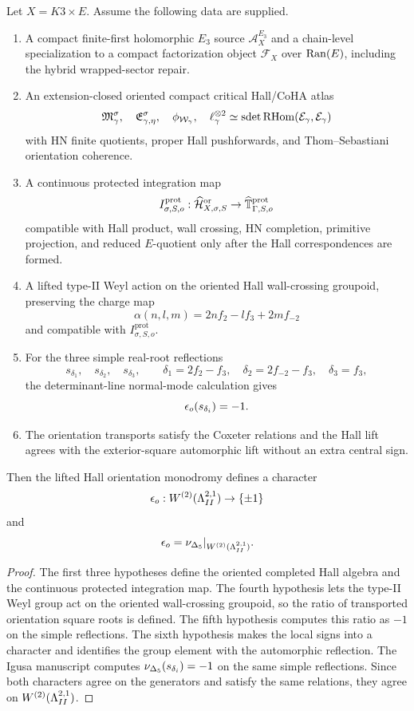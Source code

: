 \begin{theorem}
\label{thm:agent15d-conditional-protected-integration}
Let \(X=K3\times E\).  Assume the following data are supplied.
\begin{enumerate}
\item A compact finite-first holomorphic \(E_3\) source
\(\mathcal A^{E_3}_X\) and a chain-level specialization to a compact
factorization object \(\mathcal F_X\) over \(\operatorname{Ran}(E)\), including the
hybrid wrapped-sector repair.
\item An extension-closed oriented compact critical Hall/CoHA atlas
\[
  \mathfrak M^\sigma_\gamma,\quad
  \mathfrak E^\sigma_{\gamma,\eta},\quad
  \phi_{\mathcal W_\gamma},\quad
  \ell_\gamma^{\otimes2}\simeq
  \operatorname{sdet}\operatorname{RHom}(\mathcal E_\gamma,\mathcal E_\gamma)
\]
with HN finite quotients, proper Hall pushforwards, and
Thom--Sebastiani orientation coherence.
\item A continuous protected integration map
\[
  I^{\mathrm{prot}}_{\sigma,S,o}:
  \widehat{\mathcal H}^{\mathrm{or}}_{X,\sigma,S}
  \to
  \widehat{\mathbb T}^{\mathrm{prot}}_{\Gamma,S,o}
\]
compatible with Hall product, wall crossing, HN completion, primitive
projection, and reduced \(E\)-quotient only after the Hall
correspondences are formed.
\item A lifted type-II Weyl action on the oriented Hall wall-crossing
groupoid, preserving the charge map
\[
  \alpha(n,l,m)=2nf_2-lf_3+2mf_{-2}
\]
and compatible with \(I^{\mathrm{prot}}_{\sigma,S,o}\).
\item For the three simple real-root reflections
\[
  s_{\delta_1},\quad s_{\delta_2},\quad s_{\delta_3},
  \qquad
  \delta_1=2f_2-f_3,\quad
  \delta_2=2f_{-2}-f_3,\quad
  \delta_3=f_3,
\]
the determinant-line normal-mode calculation gives
\[
  \epsilon_o(s_{\delta_i})=-1.
\]
\item The orientation transports satisfy the Coxeter relations and the
Hall lift agrees with the exterior-square automorphic lift without an
extra central sign.
\end{enumerate}
Then the lifted Hall orientation monodromy defines a character
\[
  \epsilon_o:W^{(2)}(\Lambda^{2,1}_{II})\to\{\pm1\}
\]
and
\[
  \epsilon_o
  =
  \nu_{\Delta_5}|_{W^{(2)}(\Lambda^{2,1}_{II})}.
\]
\end{theorem}

\begin{proof}
The first three hypotheses define the oriented completed Hall algebra
and the continuous protected integration map.  The fourth hypothesis
lets the type-II Weyl group act on the oriented wall-crossing groupoid,
so the ratio of transported orientation square roots is defined.  The
fifth hypothesis computes this ratio as \(-1\) on the simple
reflections.  The sixth hypothesis makes the local signs into a
character and identifies the group element with the automorphic
reflection.  The Igusa manuscript computes
\(\nu_{\Delta_5}(s_{\delta_i})=-1\) on the same simple reflections.  Since
both characters agree on the generators and satisfy the same relations,
they agree on \(W^{(2)}(\Lambda^{2,1}_{II})\).
\end{proof}

